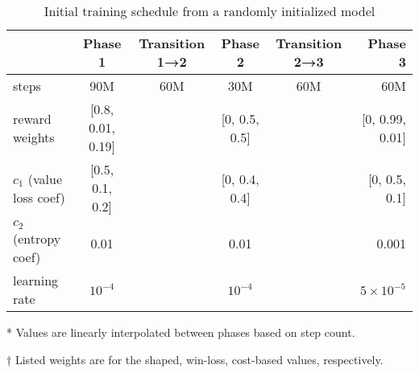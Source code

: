 \documentclass{article}
\begin{document}
\begin{table}[H]
\end{table}

\begin{table}[H]
    \centering
    \begin{threeparttable}
    \caption{Initial training schedule from a randomly initialized model}
    \label{tab:initial-training-schedule}
    \begin{tabular}{lccccr}
    \toprule
     & Phase 1 & Transition 1→2\tnote{*} & Phase 2 & Transition 2→3\tnote{*} & Phase 3 \\
    \midrule
    steps & 90M & 60M & 30M & 60M & 60M \\
    reward weights\tnote{†} & [0.8, 0.01, 0.19] &  & [0, 0.5, 0.5] &  & [0, 0.99, 0.01] \\
    $c_1$ (value loss coef)\tnote{†} & [0.5, 0.1, 0.2] &  & [0, 0.4, 0.4] &  & [0, 0.5, 0.1]\\
    $c_2$ (entropy coef)& 0.01 & & 0.01 & & 0.001 \\
    learning rate & $10^{-4}$ & & $10^{-4}$ & & $5 \times 10^{-5}$\\
    \bottomrule
    \end{tabular}
    \begin{tablenotes}
       \item[*] Values are linearly interpolated between phases based on step count.
       \item[†] Listed weights are for the shaped, win-loss, cost-based values, respectively.
    \end{tablenotes}
    \end{threeparttable}
\end{table}
\end{document}
